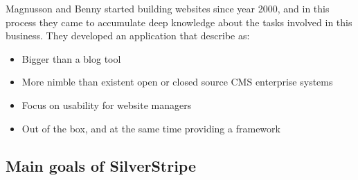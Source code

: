 \documentclass[11pt]{article} %
\begin{document}
Magnusson and Benny started building websites since year 2000, and in this process they came to accumulate deep knowledge about the tasks involved in this business. They developed an application that describe as:

  	\begin{itemize}
  	  \item Bigger than a blog tool
  	  \item More nimble than existent open or closed source CMS enterprise systems
  	  \item Focus on usability for website managers
  	  \item Out of the box, and at the same time providing a framework
  	\end{itemize}

\subsection{Main goals of SilverStripe}
\end{document}
